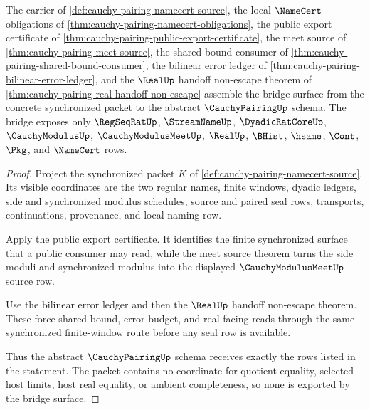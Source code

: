 \begin{theorem}
\label{thm:cauchy-pairing-bridge-synchronized-window-schema}
The carrier of \autoref{def:cauchy-pairing-namecert-source}, the local $\NameCert$ obligations of \autoref{thm:cauchy-pairing-namecert-obligations}, the public export certificate of \autoref{thm:cauchy-pairing-public-export-certificate}, the meet source of \autoref{thm:cauchy-pairing-meet-source}, the shared-bound consumer of \autoref{thm:cauchy-pairing-shared-bound-consumer}, the bilinear error ledger of \autoref{thm:cauchy-pairing-bilinear-error-ledger}, and the $\RealUp$ handoff non-escape theorem of \autoref{thm:cauchy-pairing-real-handoff-non-escape} assemble the bridge surface from the concrete synchronized packet to the abstract $\CauchyPairingUp$ schema. The bridge exposes only $\RegSeqRatUp$, $\StreamNameUp$, $\DyadicRatCoreUp$, $\CauchyModulusUp$, $\CauchyModulusMeetUp$, $\RealUp$, $\BHist$, $\hsame$, $\Cont$, $\Pkg$, and $\NameCert$ rows.
\end{theorem}
\begin{proof}
Project the synchronized packet $K$ of \autoref{def:cauchy-pairing-namecert-source}. Its visible coordinates are the two regular names, finite windows, dyadic ledgers, side and synchronized modulus schedules, source and paired seal rows, transports, continuations, provenance, and local naming row.

Apply the public export certificate. It identifies the finite synchronized surface that a public consumer may read, while the meet source theorem turns the side moduli and synchronized modulus into the displayed $\CauchyModulusMeetUp$ source row.

Use the bilinear error ledger and then the $\RealUp$ handoff non-escape theorem. These force shared-bound, error-budget, and real-facing reads through the same synchronized finite-window route before any seal row is available.

Thus the abstract $\CauchyPairingUp$ schema receives exactly the rows listed in the statement. The packet contains no coordinate for quotient equality, selected host limits, host real equality, or ambient completeness, so none is exported by the bridge surface.
\end{proof}


